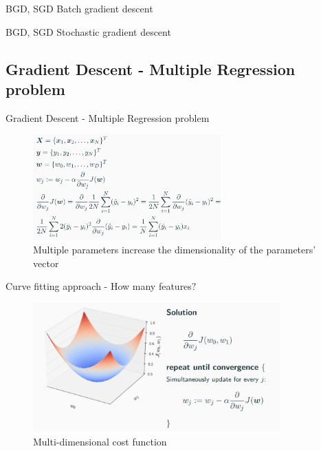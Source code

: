 \documentclass{beamer}
\begin{document}
\begin{frame}{BGD, SGD}
Batch gradient descent
\end{frame}

\begin{frame}{BGD, SGD}
Stochastic gradient descent
\end{frame}

\subsection{Gradient Descent - Multiple Regression problem}
\begin{frame}{Gradient Descent - Multiple Regression problem}
\begin{figure}
  \centering
    \includegraphics[width=0.65\textwidth]{gradientdescentmultipleregression}
  		\caption{ Multiple parameters increase the dimensionality of the parameters' vector }
    \label{gradientdescentmultipleregression}
 \end{figure}
\end{frame}

\begin{frame}{Curve fitting approach - How many features$?$}
\begin{figure}
  \centering
    \includegraphics[width=0.85\textwidth]{twoparametercostfunction}
  		\caption{ Multi-dimensional cost function }
    \label{twoparametercostfunction}
 \end{figure}
\end{frame}
\end{document}

